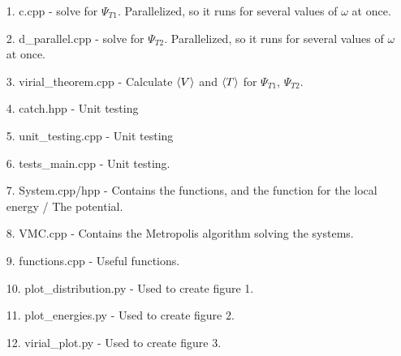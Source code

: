 \documentclass[10pt,a4paper]{article}
\begin{document}
\begin{itemize}
\item[1.] c.cpp - solve for $\Psi_{T1}$. Parallelized, so it runs for several values of $\omega$ at once.
\item[2.] d\_parallel.cpp - solve for $\Psi_{T2}$.  Parallelized, so it runs for several values of $\omega$ at once.
\item[3.]  virial\_theorem.cpp - Calculate $\braket{V}$ and $\braket{T}$ for  $\Psi_{T1}$,  $\Psi_{T2}$.
\item[4.] catch.hpp - Unit testing
\item[5.]unit\_testing.cpp - Unit testing
\item[6.] tests\_main.cpp - Unit testing.
\item[7.] System.cpp/hpp - Contains the functions, and the function for the local energy / The potential.
\item[8.] VMC.cpp - Contains the Metropolis algorithm solving the systems.
\item[9.] functions.cpp - Useful functions.
\item[10.] plot\_distribution.py - Used to create figure 1. 
\item[11.]  plot\_energies.py - Used to create figure 2.
\item[12.]  virial\_plot.py - Used to create figure 3.
\end{itemize}

\end{document}
